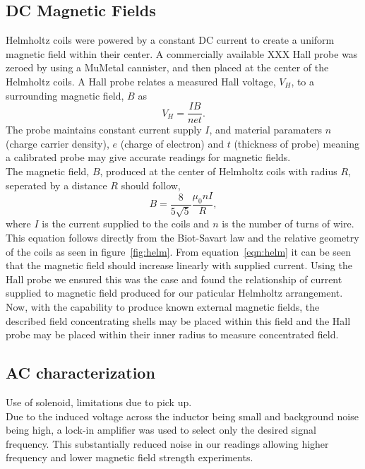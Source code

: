 \documentclass[11pt]{iopart}
\begin{document}
\subsection{DC Magnetic Fields}
Helmholtz coils were powered by a constant DC current to create a
uniform magnetic field within their center. A commercially available
XXX Hall probe was zeroed by using a MuMetal cannister, and then
placed at the center of the Helmholtz coils.  A Hall probe relates a
measured Hall voltage, $V_H$, to a surrounding magnetic field, $B$
\cite{XXX} as
\begin{equation}
  V_H = \frac{IB}{net}.
\end{equation}
The probe maintains constant current supply $I$, and material
paramaters $n$ (charge carrier density), $e$ (charge of electron) and
$t$ (thickness of probe) meaning a calibrated probe may give accurate
readings for magnetic fields.\\
The magnetic field, $B$, produced at the center of Helmholtz coils
with radius $R$, seperated by a distance $R$ should follow,
\begin{equation}
  B = \frac{8}{5\sqrt{5}}\frac{\mu_0 nI}{R},
  \label{eqn:helm}
\end{equation}
where $I$ is the current supplied to the coils and $n$ is the number of
turns of wire. This equation follows directly from the Biot-Savart law
\cite{XXX} and the relative geometry of the coils as seen in
figure~\ref{fig:helm}. From equation~\ref{eqn:helm} it can be seen that
the magnetic field should increase linearly with supplied
current. Using the Hall probe we ensured this was the case and found
the relationship of current supplied to magnetic field produced for
our paticular Helmholtz arrangement.\\ Now, with the capability to
produce known external magnetic fields, the described field
concentrating shells may be placed within this field and the Hall
probe may be placed within their inner radius to measure concentrated
field.

\subsection{AC characterization}

Use of solenoid, limitations due to pick up.\\
Due to the induced voltage across the inductor being small and
background noise being high, a lock-in amplifier was used to select
only the desired signal frequency. This substantially reduced noise in
our readings allowing higher frequency and lower magnetic field
strength experiments.\\
\end{document}
